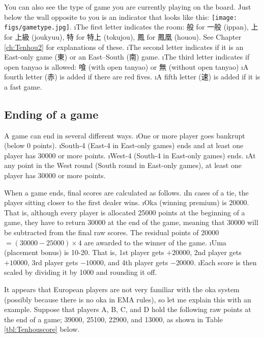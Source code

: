 \bigskip

You can also see the type of game you are currently playing on the board. Just below the wall opposite to you is an indicator that looks like this: \texttt{[image: figs/gametype.jpg]}. 
\bi
\i The first letter indicates the room: 般 for 一般 ({\jap ippan}), 上 for 上級 ({\jap joukyuu}), 特 for 特上 ({\jap tokujou}), 鳳 for 鳳凰 ({\jap houou}). See Chapter \ref{ch:Tenhou2} for explanations of these.
\i The second letter indicates if it is an East-only game (東) or an East--South (南) game.
\i The third letter indicates if open {\jap tanyao} is allowed: 喰 (with open {\jap tanyao}) or 無 (without open {\jap tanyao})
\i A fourth letter (赤) is added if there are red fives.
\i A fifth letter (速) is added if it is a fast game. 
\ei


\bigskip
\subsection{Ending of a game}
A game can end in several different ways. 
\bi
\i One or more player goes bankrupt (below 0 points). 
\i South-4 (East-4 in East-only games) ends and at least one player has 30000 or more points.
\i West-4 (South-4 in East-only games) ends.
\i At any point in the West round (South round in East-only games), at least one player has 30000 or more points. 
\ei

When a game ends, final scores are calculated as follows. 
\bi
\i In cases of a tie, the player sitting closer to the first dealer wins. 
\i {\jap Oka} (winning premium) is 20000. That is, although every player is allocated 25000 points at the beginning of a game, they have to return 30000 at the end of the game, meaning that 30000 will be subtracted from the final raw scores. 
The residual points of 20000 $= (30000 - 25000)  \times 4$ are awarded to the winner of the game.
\i {\jap Uma} (placement bonus) is 10-20. That is, 1st player gets $+ 20000$, 2nd player gets $+ 10000$, 3rd player gets $-10000$, and 4th player gets $-20000$. 
\i Each score is then scaled by dividing it by 1000 and rounding it off. 
\ei 

It appears that European players are not very familiar with the {\jap oka} system (possibly because there is no {\jap oka} in EMA rules), so let me explain this with an example. Suppose that players A, B, C, and D hold the following raw points at the end of a game; 39000, 25100, 22900, and 13000, as shown in Table \ref{tbl:Tenhouscore} below.

